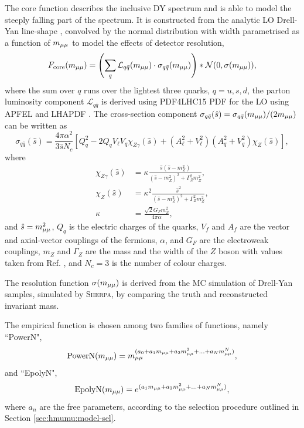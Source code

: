 The core function describes the inclusive DY spectrum and
is able to model the steeply falling part of the spectrum.
It is constructed from the analytic LO Drell-Yan line-shape
\cite{Aaboud:2017ffb}, convolved by the normal distribution
with width parametrised as a function of $m_{\mu\mu}$ to model
the effects of detector resolution,
\begin{equation}
F_\text{core}(m_{\mu\mu}) =
\left( \sum_q \mathcal{L}_{q\bar q}(m_{\mu\mu}) \cdot \sigma_{q\bar q}(m_{\mu\mu}) \right) * \mathcal{N}(0, \sigma(m_{\mu\mu})),
\end{equation}
where the sum over $q$ runs over the lightest three quarks,
$q = u, s, d$, the parton luminosity component $\mathcal{L}_{q\bar q}$
is derived using PDF4LHC15 PDF for the LO using APFEL
\cite{Bertone:2013vaa} and LHAPDF \cite{Buckley:2014ana}.
The cross-section component
$\sigma_{q\bar q}(\hat s) = \sigma_{q\bar q}(m_{\mu\mu}) / (2m_{\mu\mu})$
can be written as \cite{ATLAS-CONF-2019-028}
\begin{equation}
\sigma_{q\bar q}(\hat s) = \frac{4\pi \alpha^2}{3\hat s N_c}
\left[
Q_q^2 - 2 Q_q V_\ell V_q \chi_{Z\gamma} (\hat s) +
(A_\ell^2 + V_\ell^2) (A_q^2 + V_q^2) \chi_Z(\hat s)
\right],
\end{equation}
where
\begin{align}
 \chi_{Z\gamma}(\hat s) & = \kappa \frac{\hat s (\hat s - m_Z^2)}{(\hat s - m_Z^2)^2 + \Gamma_Z^2 m_Z^2}, \\
 \chi_{Z}(\hat s)       & = \kappa^2 \frac{{\hat s}^2}{(\hat s - m_Z^2)^2 + \Gamma_Z^2 m_Z^2}, \\
 \kappa                 & = \frac{\sqrt{2}G_Fm_Z^2}{4\pi \alpha},
\end{align}
and $\hat s = m_{\mu\mu}^2$, $Q_q$ is the electric charges of the quarks,
$V_f$ and $A_f$ are the vector and axial-vector couplings of the fermions,
$\alpha$, and $G_F$ are the electroweak couplings,
$m_Z$ and $\Gamma_Z$ are the mass and the width of the $Z$ boson with values
taken from Ref. \cite{Patrignani:2016xqp},
and $N_c = 3$ is the number of colour charges.

The resolution function $\sigma(m_{\mu\mu})$ is derived from the
MC simulation of Drell-Yan samples, simulated by \textsc{Sherpa},
by comparing the truth and reconstructed invariant mass.

The empirical function is chosen among two families of functions,
namely ``PowerN",
\begin{equation}
\text{PowerN}(m_{\mu\mu}) = m_{\mu\mu}^{(a_0 + a_1m_{\mu\mu} + a_2 m_{\mu\mu}^2 + ... + a_Nm_{\mu\mu}^N)},
\end{equation}
and ``EpolyN",
\begin{equation}
\text{EpolyN}(m_{\mu\mu}) = e^{(a_1m_{\mu\mu} + a_2 m_{\mu\mu}^2 + ... + a_Nm_{\mu\mu}^N)},
\end{equation}
where $a_n$ are the free parameters, according to the selection
procedure outlined in Section \ref{sec:hmumu:model-sel}.

